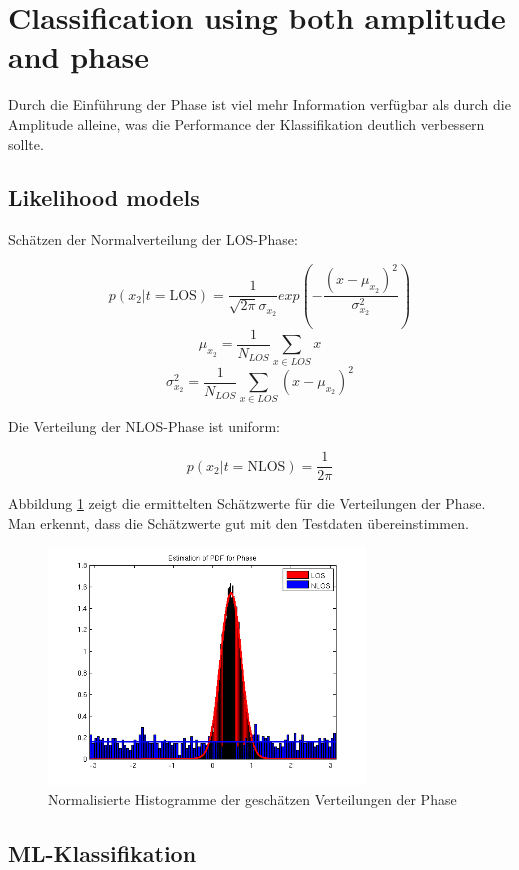 \section{Classification using both amplitude and phase}

Durch die Einführung der Phase ist viel mehr Information verfügbar als durch die Amplitude alleine, was die Performance der Klassifikation deutlich verbessern sollte.

\subsection{Likelihood models}

Schätzen der Normalverteilung der LOS-Phase:

$$ p(x_2 | t = \mathrm{LOS}) = \frac{1}{\sqrt{2 \pi} \sigma_{x_2}} exp(-\frac{(x - \mu_{x_2})^2}{\sigma_{x_2}^2}) $$
$$ \mu_{x_2} = \frac{1}{N_{LOS}} \sum_{x \in LOS} x $$
$$ \sigma_{x_2}^2 = \frac{1}{N_{LOS}} \sum_{x \in LOS} (x - \mu_{x_2})^2 $$

Die Verteilung der NLOS-Phase ist uniform:

$$ p(x_2 | t = \mathrm{NLOS}) = \frac{1}{2 \pi} $$

Abbildung \ref{fig:5_1_2_estimation} zeigt die ermittelten Schätzwerte für die Verteilungen der Phase. Man erkennt, dass die Schätzwerte gut mit den Testdaten übereinstimmen.

\begin{figure}[h!]
  \centering
  \includegraphics[width=0.75\textwidth]{./figures/5_1_2_estimation.png}
  \caption{Normalisierte Histogramme der geschätzen Verteilungen der Phase}
  \label{fig:5_1_2_estimation}
\end{figure}


\subsection{ML-Klassifikation}

